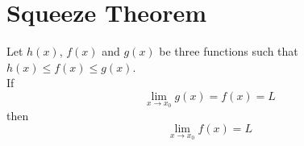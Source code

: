 \documentclass{article}
\begin{document}
\section{Squeeze Theorem}

Let \(h(x)\), \(f(x)\) and \(g(x)\) be three functions such that
\(h(x) \leq f(x) \leq g(x)\). \\
If
\[
    \lim_{x \to x_0} g(x) = f(x) = L
\]
then
\[
    \lim_{x \to x_0} f(x) = L
\]


\end{document}
